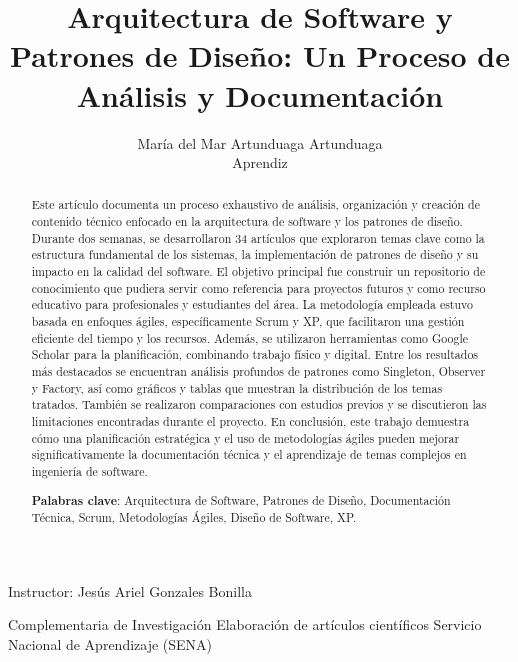 \documentclass[12pt, a4paper]{article}
\title{Arquitectura de Software y Patrones de Diseño: Un Proceso de Análisis y Documentación}
\author{María del Mar Artunduaga Artunduaga\\Aprendiz}
\begin{document}
\maketitle

\begin{center}
    Instructor: Jesús Ariel Gonzales Bonilla
\end{center}

\begin{center}{Complementaria de Investigación}
Elaboración de artículos científicos
    Servicio Nacional de Aprendizaje (SENA) \\
    
\end{center}\\
\begin{abstract}
Este artículo documenta un proceso exhaustivo de análisis, organización y creación de contenido técnico enfocado en la arquitectura de software y los patrones de diseño. Durante dos semanas, se desarrollaron 34 artículos que exploraron temas clave como la estructura fundamental de los sistemas, la implementación de patrones de diseño y su impacto en la calidad del software. El objetivo principal fue construir un repositorio de conocimiento que pudiera servir como referencia para proyectos futuros y como recurso educativo para profesionales y estudiantes del área. La metodología empleada estuvo basada en enfoques ágiles, específicamente Scrum y XP, que facilitaron una gestión eficiente del tiempo y los recursos. Además, se utilizaron herramientas como Google Scholar para la planificación, combinando trabajo físico y digital. Entre los resultados más destacados se encuentran análisis profundos de patrones como Singleton, Observer y Factory, así como gráficos y tablas que muestran la distribución de los temas tratados. También se realizaron comparaciones con estudios previos y se discutieron las limitaciones encontradas durante el proyecto. En conclusión, este trabajo demuestra cómo una planificación estratégica y el uso de metodologías ágiles pueden mejorar significativamente la documentación técnica y el aprendizaje de temas complejos en ingeniería de software.

\textbf{Palabras clave}: Arquitectura de Software, Patrones de Diseño, Documentación Técnica, Scrum, Metodologías Ágiles, Diseño de Software, XP.
\end{abstract}

\tableofcontents
\end{document}
